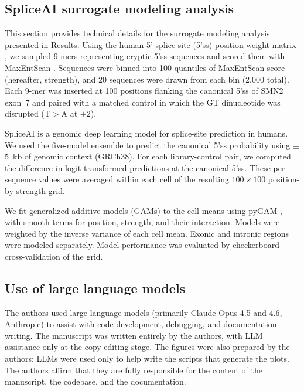 \documentclass[pdflatex,sn-vancouver-num,referee,oneside]{sn-jnl}
\newif\ifshowquoted
\newcommand{\quoted}[1]{\ifshowquoted\textcolor{quotedtext}{#1}\else#1\fi}
\begin{document}
\subsection*{SpliceAI surrogate modeling analysis}\label{subsec:spliceai-surrogate-analysis}

This section provides technical details for the surrogate modeling analysis presented in Results. Using the human 5' splice site (5'ss) position weight matrix \citep{Wong2018quantitative}, we sampled 9-mers representing cryptic 5'ss sequences and scored them with MaxEntScan \citep{Yeo2004me}. Sequences were binned into 100 quantiles of MaxEntScan score (hereafter, strength), and 20 sequences were drawn from each bin (2,000 total). Each 9-mer was inserted at 100 positions flanking the canonical 5'ss of SMN2 exon~7 and paired with a matched control in which the GT dinucleotide was disrupted (T$>$A at $+2$).

\quoted{SpliceAI \citep{Jaganathan2019ps} is a genomic deep learning model for splice-site prediction in humans. We used the five-model ensemble to predict the canonical 5'ss probability using $\pm$5~kb of genomic context (GRCh38).} For each library-control pair, we computed the difference in logit-transformed predictions at the canonical 5'ss. These per-sequence values were averaged within each cell of the resulting $100 \times 100$ position-by-strength grid.

We fit generalized additive models (GAMs) to the cell means using pyGAM \citep{Serven2018pg}, with smooth terms for position, strength, and their interaction. Models were weighted by the inverse variance of each cell mean. Exonic and intronic regions were modeled separately. Model performance was evaluated by checkerboard cross-validation of the grid.

\subsection*{Use of large language models}\label{subsec:llm-disclosure}

\quoted{The authors used large language models (primarily Claude Opus 4.5 and 4.6, Anthropic) to assist with code development, debugging, and documentation writing. The manuscript was written entirely by the authors, with LLM assistance only at the copy-editing stage. The figures were also prepared by the authors; LLMs were used only to help write the scripts that generate the plots. The authors affirm that they are fully responsible for the content of the manuscript, the codebase, and the documentation.} 
\end{document}
